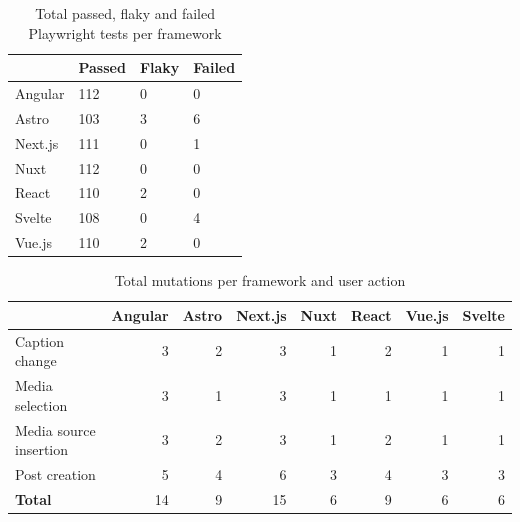 \documentclass[a4paper, 10pt]{article}
\begin{document}
\begin{table}[!ht]
  \centering
  \begin{tabular}{|l|l|l|l|}
    \hline
    ~         & \textbf{Passed} & \textbf{Flaky}  & \textbf{Failed} \\ \hline
    Angular   & 112             & 0               & 0               \\ \hline
    Astro     & 103             & 3               & 6               \\ \hline
    Next.js   & 111             & 0               & 1               \\ \hline
    Nuxt      & 112             & 0               & 0               \\ \hline
    React     & 110             & 2               & 0               \\ \hline
    Svelte    & 108             & 0               & 4               \\ \hline
    Vue.js    & 110             & 2               & 0               \\ \hline
  \end{tabular}
  \caption{Total passed, flaky and failed Playwright tests per framework}
  \label{tab:playwright:total}
\end{table}

\begin{table}[!ht]
  \centering
  \begin{adjustbox}{angle=90}
    \begin{tabular}{|l|r|r|r|r|r|r|r|}
      \hline
      ~                       & \textbf{Angular}  & \textbf{Astro}  & \textbf{Next.js}  & \textbf{Nuxt} & \textbf{React}  & \textbf{Vue.js} & \textbf{Svelte} \\ \hline
      Caption change          & 3                 & 2               & 3                 & 1             & 2               & 1               & 1               \\ \hline
      Media selection         & 3                 & 1               & 3                 & 1             & 1               & 1               & 1               \\ \hline
      Media source insertion  & 3                 & 2               & 3                 & 1             & 2               & 1               & 1               \\ \hline
      Post creation           & 5                 & 4               & 6                 & 3             & 4               & 3               & 3               \\ \hline\hline
      \textbf{Total}          & 14                & 9               & 15                & 6             & 9               & 6               & 6               \\ \hline
    \end{tabular}
  \end{adjustbox}
  \caption{Total mutations per framework and user action}
  \label{tab:mutations:total}
\end{table}
\end{document}
